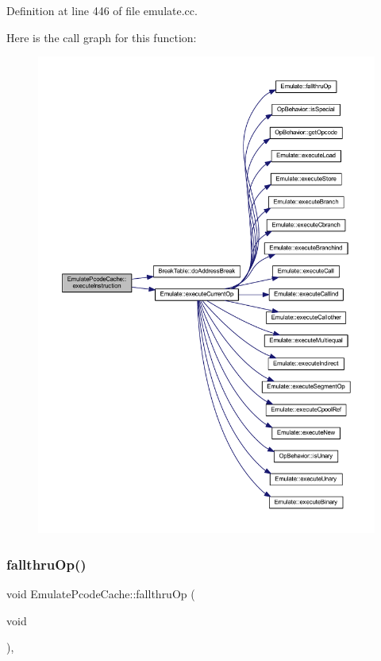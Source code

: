 Definition at line 446 of file emulate.\+cc.

Here is the call graph for this function\+:
\nopagebreak
\begin{figure}[H]
\begin{center}
\leavevmode
\includegraphics[width=350pt]{class_emulate_pcode_cache_affaf407ab847a7ec409bac7d564c119c_cgraph}
\end{center}
\end{figure}
\mbox{\label{class_emulate_pcode_cache_a57be50a3c9751a6bcb40bf8c080f7774}} 
\subsubsection{\texorpdfstring{fallthruOp()}{fallthruOp()}}
{\footnotesize\ttfamily void Emulate\+Pcode\+Cache\+::fallthru\+Op (\begin{DoxyParamCaption}\item[{void}]{ }\end{DoxyParamCaption})\hspace{0.3cm}{\ttfamily [protected]}, {\ttfamily [virtual]}}



